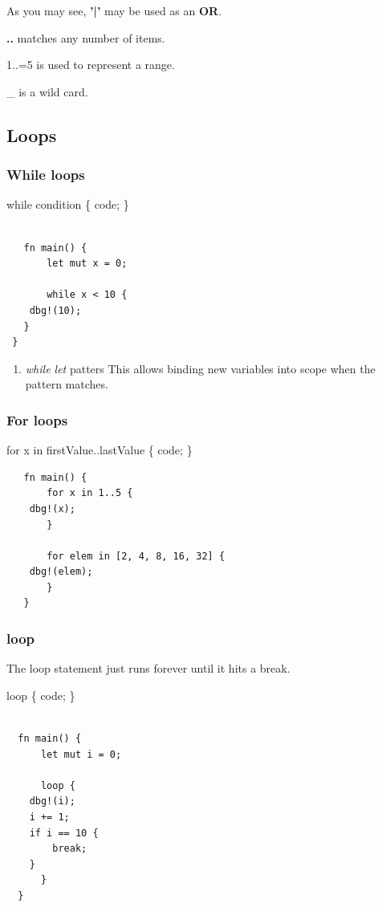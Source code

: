 \documentclass[11pt]{article}
\begin{document}
As you may see, \textbf{'|'} may be used as an \textbf{OR}.

\textbf{..} matches any number of items.

1..=5 is used to represent a range.

\_ is a wild card.
\subsection{Loops}
\label{sec:org52e51b7}
\subsubsection{While loops}
\label{sec:org8caec17}

while condition \{
     code;
 \}

\begin{verbatim}

   fn main() {
       let mut x = 0;

       while x < 10 {
   	dbg!(10);  	
   }
 }

\end{verbatim}
\begin{enumerate}
\item \emph{while let} patters
\label{sec:orgca5d977}
This allows binding new variables into scope when the pattern matches.
\end{enumerate}
\subsubsection{For loops}
\label{sec:orgbdc0420}

for x in firstValue..lastValue \{
     code;
 \}

\begin{verbatim}
   fn main() {
       for x in 1..5 {
   	dbg!(x);
       }

       for elem in [2, 4, 8, 16, 32] {
   	dbg!(elem);
       }
   }
\end{verbatim}
\subsubsection{loop}
\label{sec:org2062c16}

The loop statement just runs forever until it hits a break.

loop \{
  code;
  \}

\begin{verbatim}

  fn main() {
      let mut i = 0;

      loop {
  	dbg!(i);
  	i += 1;
  	if i == 10 {
  	    break;
  	}
      }
  }

\end{verbatim}
\end{document}
